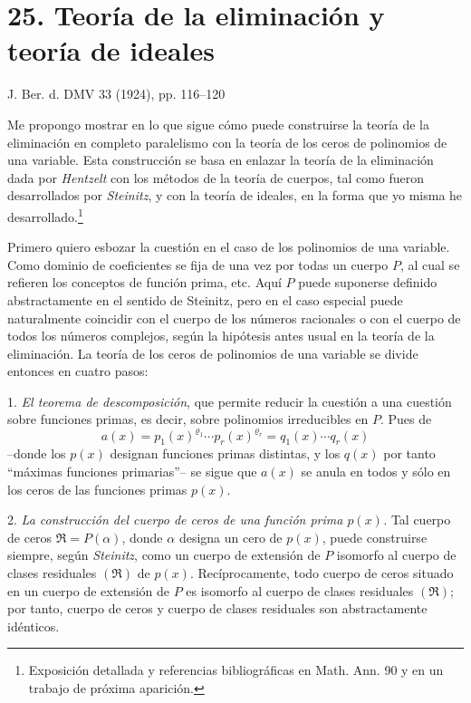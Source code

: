 \documentclass[11pt]{article}
\begin{document}
\section*{25. Teoría de la eliminación y teoría de ideales}

\begin{center}
J. Ber. d. DMV 33 (1924), pp. 116--120
\end{center}

Me propongo mostrar en lo que sigue cómo puede construirse la teoría de la eliminación en completo paralelismo con la teoría de los ceros de polinomios de una variable. Esta construcción se basa en enlazar la teoría de la eliminación dada por \emph{Hentzelt} con los métodos de la teoría de cuerpos, tal como fueron desarrollados por \emph{Steinitz}, y con la teoría de ideales, en la forma que yo misma he desarrollado.\footnote{Exposición detallada y referencias bibliográficas en Math. Ann. 90 y en un trabajo de próxima aparición.}

Primero quiero esbozar la cuestión en el caso de los polinomios de una variable. Como dominio de coeficientes se fija de una vez por todas un cuerpo $P$, al cual se refieren los conceptos de función prima, etc. Aquí $P$ puede suponerse definido abstractamente en el sentido de Steinitz, pero en el caso especial puede naturalmente coincidir con el cuerpo de los números racionales o con el cuerpo de todos los números complejos, según la hipótesis antes usual en la teoría de la eliminación. La teoría de los ceros de polinomios de una variable se divide entonces en cuatro pasos:

1. \emph{El teorema de descomposición}, que permite reducir la cuestión a una cuestión sobre funciones primas, es decir, sobre polinomios irreducibles en $P$. Pues de
\[
 a(x)=p_1(x)^{\varrho_1}\cdots p_r(x)^{\varrho_r}=q_1(x)\cdots q_r(x)
\]
--donde los $p(x)$ designan funciones primas distintas, y los $q(x)$ por tanto ``máximas funciones primarias''-- se sigue que $a(x)$ se anula en todos y sólo en los ceros de las funciones primas $p(x)$.

2. \emph{La construcción del cuerpo de ceros de una función prima $p(x)$.} Tal cuerpo de ceros $\mathfrak R=P(\alpha)$, donde $\alpha$ designa un cero de $p(x)$, puede construirse siempre, según \emph{Steinitz}, como un cuerpo de extensión de $P$ isomorfo al cuerpo de clases residuales $(\mathfrak R)$ de $p(x)$. Recíprocamente, todo cuerpo de ceros situado en un cuerpo de extensión de $P$ es isomorfo al cuerpo de clases residuales $(\mathfrak R)$; por tanto, cuerpo de ceros y cuerpo de clases residuales son abstractamente idénticos.
\end{document}
